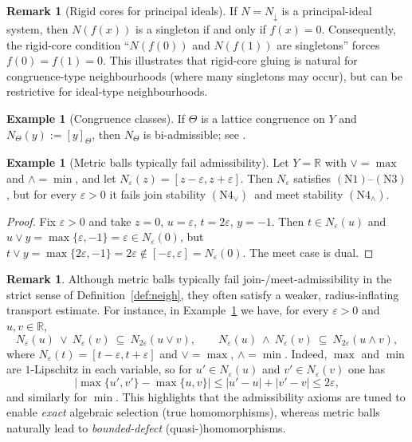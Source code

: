 \documentclass[11pt]{amsart}
\theoremstyle{definition}
\newtheorem{remark}[theorem]{Remark}
\newtheorem{example}[theorem]{Example}
\newcommand{\join}{\vee}
\newcommand{\meet}{\wedge}
\newcommand{\NOne}{\ensuremath{\mathrm{(N1)}}}
\newcommand{\NThree}{\ensuremath{\mathrm{(N3)}}}
\newcommand{\NFourJoin}{\ensuremath{\mathrm{(N4_{\vee})}}}
\newcommand{\NFourMeet}{\ensuremath{\mathrm{(N4_{\wedge})}}}
\begin{document}
\begin{remark}[Rigid cores for principal ideals]\label{rem:rigid-ideal}
If $N=N_\downarrow$ is a principal-ideal system, then $N(f(x))$ is a singleton if and only if $f(x)=0$.
Consequently, the rigid-core condition ``$N(f(0))$ and $N(f(1))$ are singletons'' forces $f(0)=f(1)=0$.
This illustrates that rigid-core gluing is natural for congruence-type neighbourhoods (where many singletons may occur),
but can be restrictive for ideal-type neighbourhoods.
\end{remark}

\begin{example}[Congruence classes]\label{ex:congruence}
If $\Theta$ is a lattice congruence on $Y$ and $N_\Theta(y):=[y]_\Theta$, then $N_\Theta$ is bi-admissible; see \cite[Example~9(d)]{BKP}.
\end{example}

\begin{example}[Metric balls typically fail admissibility]\label{ex:metric-balls}
Let $Y=\mathbb{R}$ with $\join=\max$ and $\meet=\min$, and let $N_\varepsilon(z)=[z-\varepsilon,z+\varepsilon]$.
Then $N_\varepsilon$ satisfies \NOne--\NThree, but for every $\varepsilon>0$ it fails join stability \NFourJoin\ and meet stability \NFourMeet.
\end{example}

\begin{proof}
Fix $\varepsilon>0$ and take $z=0$, $u=\varepsilon$, $t=2\varepsilon$, $y=-1$.
Then $t\in N_\varepsilon(u)$ and $u\join y=\max\{\varepsilon,-1\}=\varepsilon\in N_\varepsilon(0)$,
but $t\join y=\max\{2\varepsilon,-1\}=2\varepsilon\notin[-\varepsilon,\varepsilon]=N_\varepsilon(0)$.
The meet case is dual.
\end{proof}

\begin{remark}
Although metric balls typically fail join-/meet-admissibility in the strict sense of
Definition~\ref{def:neigh}, they often satisfy a weaker, radius-inflating transport estimate.
For instance, in Example~\ref{ex:metric-balls} we have, for every $\varepsilon>0$ and $u,v\in\mathbb{R}$,
\[
N_\varepsilon(u)\ \join\ N_\varepsilon(v)\ \subseteq\ N_{2\varepsilon}(u\join v),
\qquad
N_\varepsilon(u)\ \meet\ N_\varepsilon(v)\ \subseteq\ N_{2\varepsilon}(u\meet v),
\]
where $N_\varepsilon(t)=[t-\varepsilon,t+\varepsilon]$ and $\join=\max$, $\meet=\min$.
Indeed, $\max$ and $\min$ are $1$-Lipschitz in each variable, so for
$u'\in N_\varepsilon(u)$ and $v'\in N_\varepsilon(v)$ one has
\[
\bigl|\max\{u',v'\}-\max\{u,v\}\bigr|\le |u'-u|+|v'-v|\le 2\varepsilon,
\]
and similarly for $\min$.
This highlights that the admissibility axioms are tuned to enable \emph{exact} algebraic
selection (true homomorphisms), whereas metric balls naturally lead to \emph{bounded-defect}
(quasi-)homomorphisms.
\end{remark}
\end{document}
